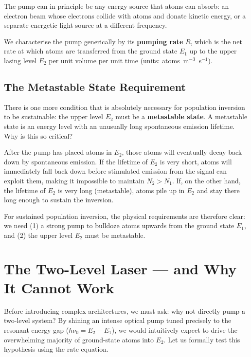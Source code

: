 The pump can in principle be any energy source that atoms can absorb: an electron beam whose electrons collide with atoms and donate kinetic energy, or a separate energetic light source at a different frequency.

We characterise the pump generically by its \textbf{pumping rate} $R$, which is the net rate at which atoms are transferred from the ground state $E_1$ up to the upper lasing level $E_2$ per unit volume per unit time (units: atoms~m$^{-3}$~s$^{-1}$).

\subsection{The Metastable State Requirement}

There is one more condition that is absolutely necessary for population inversion to be sustainable: the upper level $E_2$ must be a \textbf{metastable state}. A metastable state is an energy level with an unusually long spontaneous emission lifetime. Why is this so critical?

After the pump has placed atoms in $E_2$, those atoms will eventually decay back down by spontaneous emission. If the lifetime of $E_2$ is very short, atoms will immediately fall back down before stimulated emission from the signal can exploit them, making it impossible to maintain $N_2 > N_1$. If, on the other hand, the lifetime of $E_2$ is very long (metastable), atoms pile up in $E_2$ and stay there long enough to sustain the inversion.

For sustained population inversion, the physical requirements are therefore clear: we need (1) a strong pump to bulldoze atoms upwards from the ground state $E_1$, and (2) the upper level $E_2$ must be metastable.

\section{The Two-Level Laser --- and Why It Cannot Work}

Before introducing complex architectures, we must ask: why not directly pump a two-level system? By shining an intense optical pump tuned precisely to the resonant energy gap ($h\nu_0 = E_2 - E_1$), we would intuitively expect to drive the overwhelming majority of ground-state atoms into $E_2$. Let us formally test this hypothesis using the rate equation.

